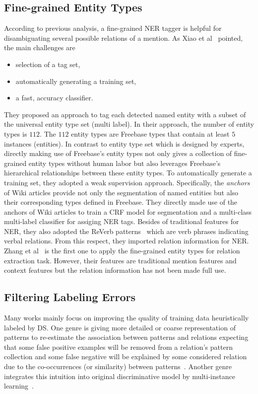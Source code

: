 \documentclass[10pt]{article} %
\theoremstyle{definition}
\theoremstyle{definition}
\begin{document}
\subsection{Fine-grained Entity Types}
According to previous analysis, a fine-grained NER tagger is helpful for disambiguating several possible relations of a mention. 
As Xiao et al~\cite{112nertag} pointed, the main challenges are 
\begin{itemize}
\item selection of a tag set, 
\item automatically generating a training set, 
\item a fast, accuracy classifier. 
\end{itemize}
They proposed an approach to tag each detected named entity with a subset of the universal entity type set (multi label). 
In their approach, the number of entity types is $112$. 
The $112$ entity types are Freebase types that contain at least $5$ instances (entities). 
In contrast to entity type set which is designed by experts, directly making use of Freebase's entity types not only gives a collection of fine-grained entity types without human labor 
but also leverages Freebase's hierarchical relationships between these entity types. 
To automatically generate a training set, they adopted a weak supervision approach. 
Specifically, the \emph{anchors} of Wiki articles provide not only the segmentation of named entities but also their corresponding types defined in Freebase. 
They directly made use of the anchors of Wiki articles to train a CRF model for segmentation and a multi-class multi-label classifier for assiging NER tags. 
Besides of traditional features for NER, they also adopted the ReVerb patterns~\cite{reverb} which are verb phrases indicating verbal relations. 
From this respect, they imported relation information for NER. 
Zhang et al~\cite{xingxing} is the first one to apply the fine-grained entity types for relation extraction task. 
However, their features are traditional mention features and context features but the relation information has not been made full use. 



\subsection{Filtering Labeling Errors}
Many works mainly focus on improving the quality of training data heuristically labeled by DS. 
One genre is giving more detailed or coarse representation of patterns to re-estimate the association between patterns and relations expecting that some false positive examples will be removed from a relation's pattern collection and some false negative will be explained by some considered relation  
due to the co-occurrences (or similarity) between patterns~\cite{takagenerative, yaolda, topicmodel, passageretrieval}. 
Another genre integrates this intuition into original discriminative model by multi-instance learning~\cite{riedel, hoffmann, surdeanu, 4layers}. 
\end{document}
